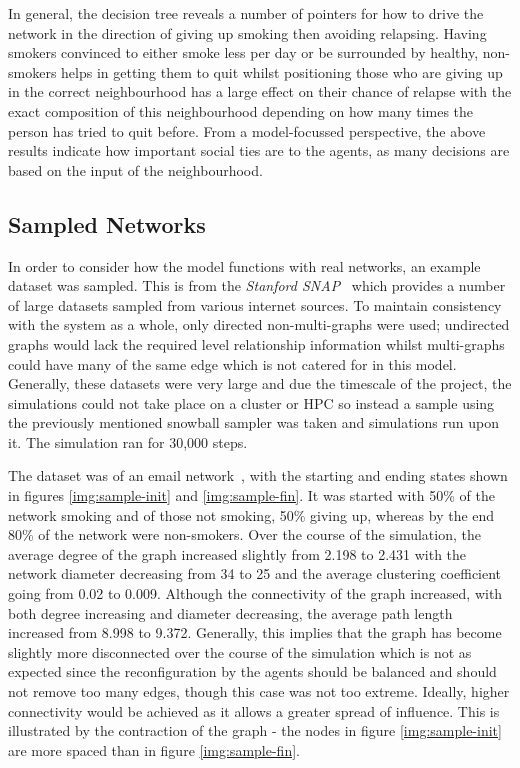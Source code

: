 \documentclass[]{report}
\begin{document}
In general, the decision tree reveals a number of pointers for how to drive the network in the direction of giving up smoking then avoiding relapsing. Having smokers convinced to either smoke less per day or be surrounded by healthy, non-smokers helps in getting them to quit whilst positioning those who are giving up in the correct neighbourhood has a large effect on their chance of relapse with the exact composition of this neighbourhood depending on how many times the person has tried to quit before. From a model-focussed perspective, the above results indicate how important social ties are to the agents, as many decisions are based on the input of the neighbourhood.

\subsection{Sampled Networks}
In order to consider how the model functions with real networks, an example dataset was sampled. This is from the \emph{Stanford SNAP}~\cite{SNAP} which provides a number of large datasets sampled from various internet sources. To maintain consistency with the system as a whole, only directed non-multi-graphs were used; undirected graphs would lack the required level relationship information whilst multi-graphs could have many of the same edge which is not catered for in this model. Generally, these datasets were very large and due the timescale of the project, the simulations could not take place on a cluster or HPC so instead a sample using the previously mentioned snowball sampler was taken and simulations run upon it. The simulation ran for 30,000 steps.

The dataset was of an email network~\cite{SNAP-email}, with the starting and ending states shown in figures \ref{img:sample-init} and \ref{img:sample-fin}. It was started with 50\% of the network smoking and of those not smoking, 50\% giving up, whereas by the end 80\% of the network were non-smokers. Over the course of the simulation, the average degree of the graph increased slightly from 2.198 to 2.431 with the network diameter decreasing from 34 to 25 and the average clustering coefficient going from 0.02 to 0.009. Although the connectivity of the graph increased, with both degree increasing and diameter decreasing, the average path length increased from 8.998 to 9.372. Generally, this implies that the graph has become slightly more disconnected over the course of the simulation which is not as expected since the reconfiguration by the agents should be balanced and should not remove too many edges, though this case was not too extreme. Ideally, higher connectivity would be achieved as it allows a greater spread of influence. This is illustrated by the contraction of the graph - the nodes in figure \ref{img:sample-init} are more spaced than in figure \ref{img:sample-fin}.
\end{document}

